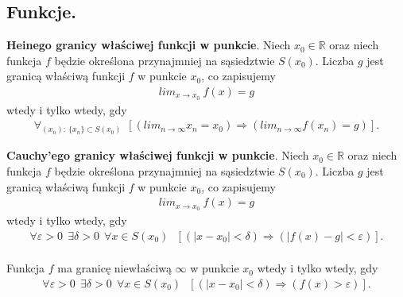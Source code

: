 \documentclass[12pt]{article}
\begin{document}
    \subsection{Funkcje.}

    \begin{definition}
        \textbf{Heinego granicy właściwej funkcji w punkcie}. Niech $x_0 \in \mathbb{R}$ oraz niech funkcja $f$ będzie
        określona przynajmniej na sąsiedztwie $S(x_0)$. Liczba $g$ jest granicą właściwą funkcji $f$ w punkcie $x_0$, co
        zapisujemy
        \begin{align*}
            lim_{x \rightarrow x_0} ~ f(x) = g
        \end{align*}
        wtedy i tylko wtedy, gdy
        \begin{align*}
            \forall_{(x_n): ~ \{x_n\} \subset S(x_0)} ~~ [(lim_{n \rightarrow \infty} x_n = x_0) \Rightarrow (lim_{n \rightarrow \infty} f(x_n) = g)].
        \end{align*}
    \end{definition}

    \begin{definition}
        \textbf{Cauchy'ego granicy właściwej funkcji w punkcie}. Niech $x_0 \in \mathbb{R}$ oraz niech funkcja $f$ będzie
        określona przynajmniej na sąsiedztwie $S(x_0)$. Liczba $g$ jest granicą właściwą funkcji $f$ w punkcie  $x_0$,
        co zapisujemy
        \begin{align*}
            lim_{x \rightarrow x_0} ~ f(x)  = g
        \end{align*}
        wtedy i tylko wtedy, gdy
        \begin{align*}
            \forall \varepsilon > 0 ~~ \exists \delta > 0 ~~ \forall  x \in S(x_0)  ~~~ [(|x - x_0| <  \delta) \Rightarrow (|f(x) - g| < \varepsilon)].
        \end{align*}
        \hfill \\

        Funkcja $f$ ma granicę niewłaściwą $\infty$ w punkcie $x_0$ wtedy i tylko wtedy, gdy
        \begin{align*}
            \forall \varepsilon > 0 ~~ \exists \delta > 0 ~~ \forall  x \in S(x_0)  ~~~ [(|x - x_0| <  \delta) \Rightarrow (f(x) > \varepsilon)].
        \end{align*}

    \end{definition}
\end{document}

